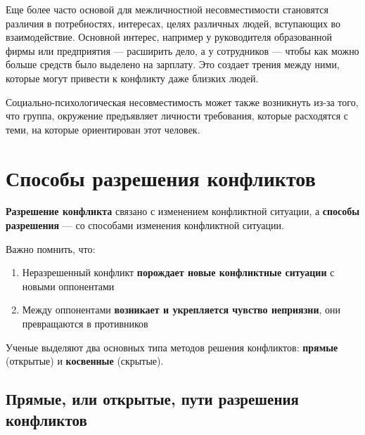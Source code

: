 \documentclass[a4paper,14pt]{extarticle}
\begin{document}
Еще более часто основой для межличностной несовместимости становятся различия в потребностях, интересах, целях  различных людей, вступающих во взаимодействие. Основной интерес, например у руководителя образованной фирмы или предприятия — расширить дело, а у сотрудников  — чтобы как можно больше средств было выделено на зарплату. Это создает трения между ними, которые могут привести к конфликту даже близких людей.

Социально-психологическая несовместимость может также возникнуть из-за того, что группа, окружение предъявляет личности требования, которые расходятся с теми, на которые ориентирован этот человек.

\pagebreak
\section{Способы разрешения конфликтов}

\textbf{Разрешение конфликта} связано с изменением конфликтной ситуации, а \textbf{способы разрешения} — со способами изменения конфликтной ситуации.

Важно помнить, что:

\begin{enumerate}
    \item Неразрешенный конфликт \textbf{порождает новые конфликтные ситуации} с новыми оппонентами
    \item Между оппонентами \textbf{возникает и укрепляется чувство неприязни}, они превращаются в противников
\end{enumerate}

Ученые выделяют два основных типа методов решения конфликтов: \textbf{прямые} (открытые) и \textbf{косвенные} (скрытые).

\subsection{Прямые, или открытые, пути разрешения конфликтов}
\end{document}
